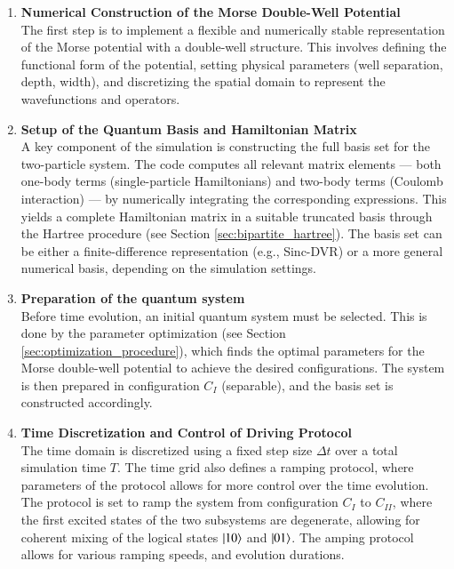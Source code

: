 \documentclass{subfiles}
\begin{document}
\begin{enumerate}
    \item \textbf{Numerical Construction of the Morse Double-Well Potential} \\
    The first step is to implement a flexible and numerically stable representation of the Morse potential with a double-well structure. This involves defining the functional form of the potential, setting physical parameters (well separation, depth, width), and discretizing the spatial domain to represent the wavefunctions and operators.

    \item \textbf{Setup of the Quantum Basis and Hamiltonian Matrix} \\
    A key component of the simulation is constructing the full basis set for the two-particle system. The code computes all relevant matrix elements — both one-body terms (single-particle Hamiltonians) and two-body terms (Coulomb interaction) — by numerically integrating the corresponding expressions. This yields a complete Hamiltonian matrix in a suitable truncated basis through the Hartree procedure (see Section \ref{sec:bipartite_hartree}). The basis set can be either a finite-difference representation (e.g., Sinc-DVR) or a more general numerical basis, depending on the simulation settings.

    \item \textbf{Preparation of the quantum system} \\
    Before time evolution, an initial quantum system must be selected. This is done by the parameter optimization (see Section \ref{sec:optimization_procedure}), which finds the optimal parameters for the Morse double-well potential to achieve the desired configurations. The system is then prepared in configuration $C_I$ (separable), and the basis set is constructed accordingly. 

    \item \textbf{Time Discretization and Control of Driving Protocol} \\
    The time domain is discretized using a fixed step size $\Delta t$ over a total simulation time $T$. The time grid also defines a ramping protocol, where parameters of the protocol allows for more control over the time evolution. The protocol is set to ramp the system from configuration $C_I$ to $C_{II}$, where the first excited states of the two subsystems are degenerate, allowing for coherent mixing of the logical states $\ket{10}$ and $\ket{01}$. The amping protocol allows for various ramping speeds, and evolution durations.


\end{enumerate}
\end{document}

